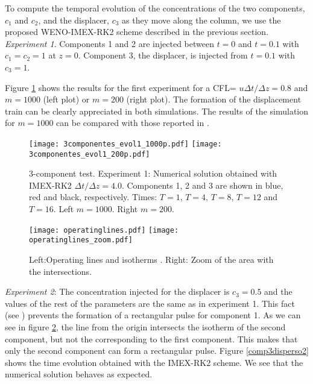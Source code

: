 \documentclass[preprint]{elsarticle}
\theoremstyle{definition}
\begin{document}
 To compute the temporal
evolution of the 
concentrations of the two components, $c_1$ and $c_2$, and the
displacer, $c_3$  as they move along the column, we use the proposed
WENO-IMEX-RK2 scheme described in the previous section. \\[10pt]

{\em Experiment 1}.  Components 1 and 2 are injected between $t=0$ and
$t=0.1$ with $c_1=c_2=1$ at $z=0$. Component 3, the displacer, is
injected from $t=0.1$ with $c_3=1$. 

 Figure \ref{comp3disperso1} shows the results for the first
 experiment for a CFL= $u \Delta t/\Delta z= 0.8$ and $m=1000$
 (left plot)
or  $m=200$ (right plot).  The
 formation of the displacement train can be clearly appreciated in
 both simulations. The results of the simulation for $m=1000$ can be
 compared with those reported in \cite{Javeed}. \\[10pt]


\begin{figure}[ht]   
\begin{center} 
\texttt{[image: 3componentes\_evol1\_1000p.pdf]}
\texttt{[image: 3componentes\_evol1\_200p.pdf]}
\end{center}   
\caption{3-component test. Experiment 1: Numerical solution obtained
  with IMEX-RK2 $ \Delta t/\Delta z=4.0$.  Components 1, 2 and 3
  are shown in blue, red and black, respectively. Times: $T=1$, $T=4$,
  $T=8$, $T=12$ and $T=16$. Left $m=1000$. Right $m=200$.}   
\label{comp3disperso1}  
\end{figure} 


\begin{figure}[ht]   
\begin{center} 
\texttt{[image: operatinglines.pdf]}
\texttt{[image: operatinglines\_zoom.pdf]}
\end{center}   
\caption{Left:Operating lines and isotherms . Right: Zoom of the area
  with the intersections.}   
\label{operatinglines}  
\end{figure} 


{\em Experiment 2}: The concentration injected for the displacer is
$c_3=0.5$ and the values of the rest of the parameters are the same as
in experiment 1. This fact (see \cite{Javeed}) prevents the formation
of a rectangular pulse for component 1. As we can see in figure
\ref{operatinglines}, the line from the origin intersects the isotherm
of the second component, but not the corresponding to the first
component. This makes that only the second component can form a
rectangular pulse. Figure \ref{comp3disperso2} shows the time
evolution obtained with the IMEX-RK2 scheme. We see that the numerical
solution behaves as expected. \\[10pt]
\end{document}
